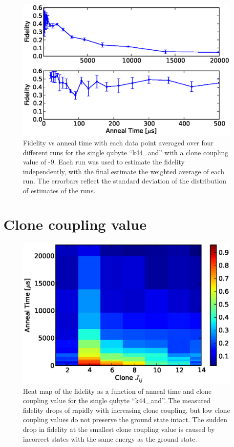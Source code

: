 \begin{figure}
	\includegraphics{img/final_single_k44.eps}
	\caption[Averaged Anneal Results]{Fidelity vs anneal time with each data point averaged over four different runs for the single qubyte ``k44\_and'' with a clone coupling value of -9.  Each run was used to estimate the fidelity independently, with the final estimate the weighted average of each run.  The errorbars reflect the standard deviation of the distribution of estimates of the runs.}
	\label{fig:results_avg}
\end{figure}




\section{Clone coupling value}
\label{sec:coupling}

\begin{figure}
	\includegraphics{img/n_8_t_v_c.eps}
	\caption[Variable Clone Coupling Fidelity]{Heat map of the fidelity as a function of anneal time and clone coupling value for the single qubyte ``k44\_and''.  The measured fidelity drops of rapidly with increasing clone coupling, but low clone coupling values do not preserve the ground state intact.  The sudden drop in fidelity at the smallest clone coupling value is caused by incorrect states with the same energy as the ground state.}
	\label{fig:clone_coupling}
\end{figure}

